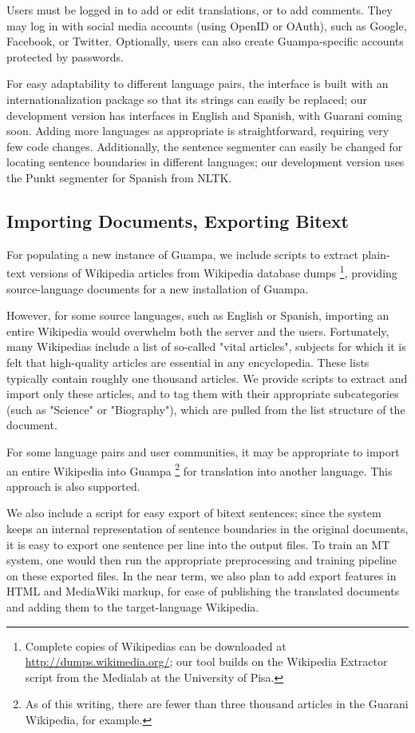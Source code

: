 \documentclass[10pt, a4paper]{article}
\begin{document}
Users must be logged in to add or edit translations, or to add comments. They
may log in with social media accounts (using OpenID or OAuth), such as Google,
Facebook, or Twitter. Optionally, users can also create Guampa-specific
accounts protected by passwords.

For easy adaptability to different language pairs, the interface is built with
an internationalization package so that its strings can easily be replaced; our
development version has interfaces in English and Spanish, with Guarani coming
soon. Adding more languages as appropriate is straightforward, requiring very
few code changes. Additionally, the sentence segmenter can easily be changed
for locating sentence boundaries in different languages; our development
version uses the Punkt segmenter for Spanish from NLTK.


\subsection{Importing Documents, Exporting Bitext}
For populating a new instance of Guampa, we include scripts to extract
plain-text versions of Wikipedia articles from Wikipedia database dumps
\footnote{Complete copies of Wikipedias can be downloaded at
\url{http://dumps.wikimedia.org/}; our tool builds on the Wikipedia Extractor
script from the Medialab at the University of Pisa. }, providing
source-language documents for a new installation of Guampa.

However, for some source languages, such as English or Spanish, importing an
entire Wikipedia would overwhelm both the server and the users. Fortunately,
many Wikipedias include a list of so-called "vital articles", subjects for
which it is felt that high-quality articles are essential in any encyclopedia.
These lists typically contain roughly one thousand articles. We provide scripts
to extract and import only these articles, and to tag them with their
appropriate subcategories (such as "Science" or "Biography"), which are pulled
from the list structure of the document.

For some language pairs and user communities, it may be appropriate to import
an entire Wikipedia into Guampa \footnote{As of this writing, there are fewer
than three thousand articles in the Guarani Wikipedia, for example.} for
translation into another language. This approach is also supported.

We also include a script for easy export of bitext sentences; since the system
keeps an internal representation of sentence boundaries in the original
documents, it is easy to export one sentence per line into the output files. To
train an MT system, one would then run the appropriate preprocessing and
training pipeline on these exported files. In the near term, we also plan to
add export features in HTML and MediaWiki markup, for ease of publishing the
translated documents and adding them to the target-language Wikipedia.
\end{document}
